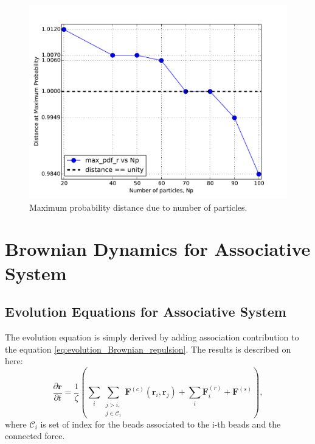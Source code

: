 \message{ !name(brief_Brownian_dynamics.tex)}\documentclass[10pt, a4paper]{report}
\begin{document}
\begin{figure}
  \centering
  \includegraphics[width=\textwidth]{figures/distance_dist.pdf}
  \caption{Maximum probability distance due to number of particles.}\label{fig:distance_distribution_repulsion}
\end{figure}






\chapter{Brownian Dynamics for Associative System}
\section{Evolution Equations for Associative System}
The evolution equation is simply derived by adding association contribution to the equation \eqref{eq:evolution_Brownian_repulsion}. The results is described on here:
\begin{equation}
\frac{\partial \mathbf{r}}{\partial t} = \frac{1}{\zeta}\left(\sum_{i}\sum_{\substack{j>i,\\j\in\mathscr{C}_i}} \mathbf{F}^{(c)}(\mathbf{r}_i, \mathbf{r}_j) + \sum_i \mathbf{F}^{(r)}_i + \mathbf{F}^{(s)}\right),\label{eq:evolution_Brownian_repulsion_association}
\end{equation}
where $\mathscr{C}_i$ is set of index for the beads associated to the i-th beads and the connected force. 
\end{document}
